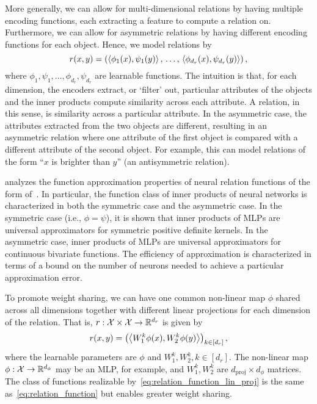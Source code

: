 More generally, we can allow for multi-dimensional relations by having multiple encoding functions, each extracting a feature to compute a relation on. Furthermore, we can allow for asymmetric relations by having different encoding functions for each object. Hence, we model relations by
\begin{equation}\label{eq:relation_function}
    r(x, y) = \left(
        \left \langle \phi_1(x), \psi_1(y) \right\rangle,\, \ldots,\, \left \langle \phi_{d_r}(x), \psi_{d_r}(y) \right\rangle\right),
\end{equation}
where $\phi_1, \psi_1, \ldots, \phi_{d_r}, \psi_{d_r}$ are learnable functions. 
The intuition is that, for each dimension, the encoders extract, or `filter' out, particular attributes of the objects and the inner products compute similarity across each attribute.
A relation, in this sense, is similarity across a particular attribute. 
In the asymmetric case, the attributes extracted from the two objects are different, resulting in an asymmetric relation where one attribute of the first object is compared with a different attribute of the second object. For example, this can model relations of the form ``$x$ is brighter than $y$'' (an antisymmetric relation).

\citet{altabaaApproximationRelationFunctions2024} analyzes the function approximation properties of neural relation functions of the form of~. In particular, the function class of inner products of neural networks is characterized in both the symmetric case and the asymmetric case. In the symmetric case (i.e., $\phi = \psi$), it is shown that inner products of MLPs are universal approximators for symmetric positive definite kernels. In the asymmetric case, inner products of MLPs are universal approximators for continuous bivariate functions. The efficiency of approximation is characterized in terms of a bound on the number of neurons needed to achieve a particular approximation error.

To promote weight sharing, we can have one common non-linear map $\phi$ shared across all dimensions together with different linear projections for each dimension of the relation. That is, $r: {\mathcal{X}} \times {\mathcal{X}} \to \mathbb{R}^{d_r}$ is given by
\begin{equation}\label{eq:relation_function_lin_proj}
    r(x, y) = \left(\left \langle W_1^{k}\phi(x), W_2^{k}\phi(y) \right\rangle\right)_{k \in [d_r]},
\end{equation}
where the learnable parameters are $\phi$ and $W_1^{k}, W_2^{k}, k \in [d_r]$. The non-linear map $\phi: {\mathcal{X}} \to \mathbb{R}^{d_\phi}$ may be an MLP, for example, and $W_1^{k}, W_2^{k}$ are $d_{\mathrm{proj}} \times d_\phi$ matrices. The class of functions realizable by~\cref{eq:relation_function_lin_proj} is the same as~\cref{eq:relation_function} but enables greater weight sharing.

